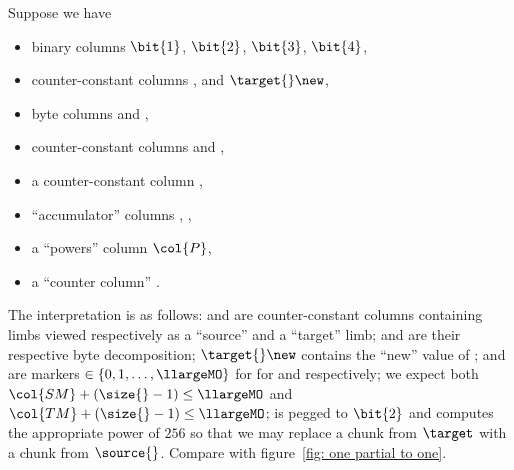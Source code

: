Suppose we have
\begin{itemize}
	\item binary columns $\bit{1}$, $\bit{2}$, $\bit{3}$, $\bit{4}$,
	\item counter-constant columns \source{}, \target{} and $\target{}\new$,
	\item byte columns \source{}\byte{} and \target{}\byte{},
	\item counter-constant columns \source{}\mark{} and \target{}\mark{},
	\item a counter-constant column \size{},
	\item ``accumulator'' columns , ,
	\item a ``powers'' column $\col{P}$,
	\item a ``counter column'' \ct{}.
\end{itemize}
The interpretation is as follows: 
\source{} and \target{} are counter-constant columns containing limbs viewed respectively as a ``source'' and a ``target'' limb;
\source{}\byte{} and \target{}\byte{} are their respective byte decomposition;
$\target{}\new$ contains the ``new'' value of \target{};
\source{}\mark{} and \target{}\mark{} are markers $\in\{0,1,\dots,\llargeMO\}$ for for \source{} and \target{} respectively;
we expect both
$\col{SM} + (\size{}-1)\leq \llargeMO$ and
$\col{TM} + (\size{}-1)\leq \llargeMO$;
 is pegged to $\bit{2}$ and computes the appropriate power of $256$ so that we may replace a chunk from $\target$ with a chunk from $\source{}$.
Compare with figure~\ref{fig: one partial to one}.


